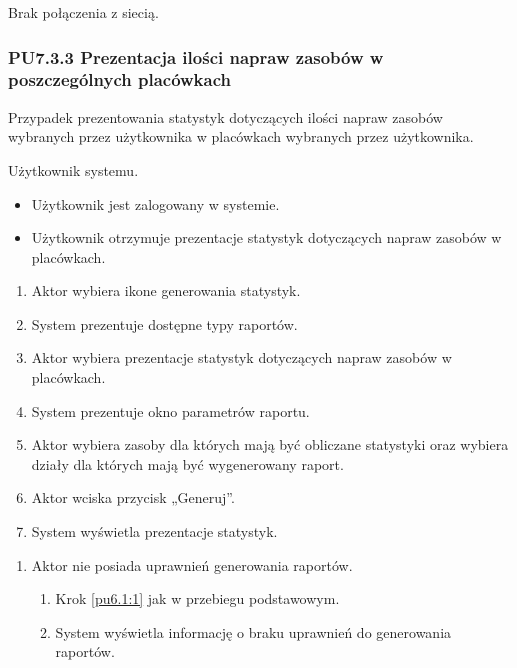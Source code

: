 Brak połączenia z siecią.

\subsubsection{PU7.3.3 Prezentacja ilości napraw zasobów w poszczególnych placówkach}
Przypadek prezentowania statystyk dotyczących ilości napraw zasobów wybranych przez użytkownika w placówkach wybranych przez użytkownika.

Użytkownik systemu.

\begin{itemize}
\item Użytkownik jest zalogowany w systemie.
\end{itemize}

\begin{itemize}
\item Użytkownik otrzymuje prezentacje statystyk dotyczących napraw zasobów w placówkach.
\end{itemize}

\begin{enumerate}
	\item \label{pu7.3.3:1} Aktor wybiera ikone generowania statystyk.
	\item System prezentuje dostępne typy raportów.
	\item \label{pu7.3.3:2} Aktor wybiera prezentacje statystyk dotyczących napraw zasobów w placówkach.
	\item System prezentuje okno parametrów raportu.
	\item Aktor wybiera zasoby dla których mają być obliczane statystyki oraz wybiera działy dla których mają być wygenerowany raport.
	\item Aktor wciska przycisk „Generuj”.
	\item System wyświetla prezentacje statystyk.
\end{enumerate}

\begin{enumerate}
	\item Aktor nie posiada uprawnień generowania raportów.
	\begin{enumerate}[label*=\arabic*.]
		\item Krok \ref{pu6.1:1} jak w przebiegu podstawowym.
		\item System wyświetla informację o braku uprawnień do generowania raportów.
	\end{enumerate}
\end{enumerate}

